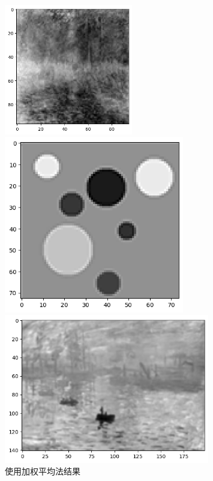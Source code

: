 \documentclass{article}
\begin{document}
\begin{figure}[htbp]
	\centering
		\begin{minipage}[c]{0.3\textwidth} %
			\centering
			\includegraphics[width=0.5\textwidth]{./report/output14.png} %
			
		\end{minipage}%
		\begin{minipage}[c]{0.2\textwidth}
			\centering
			\includegraphics[width=0.7\textwidth]{./report/output15.png}
			
		\end{minipage}
		\begin{minipage}[c]{0.2\textwidth}
			\centering
			\includegraphics[width=0.8\textwidth]{./report/output16.png}
			
		\end{minipage}
		\caption*{使用加权平均法结果}
\end{figure}
 \setcounter{section}{8}
\end{document}
